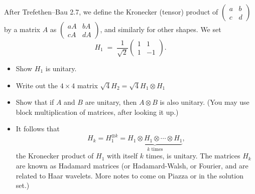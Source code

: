 \documentclass[lang=cn,11pt]{elegantbook}
\begin{document}
After Trefethen--Bau 2.7, we define the Kronecker (tensor) product of
\(\begin{pmatrix}a & b \\ c & d\end{pmatrix}\) by a matrix \(A\)
as \(\begin{pmatrix}aA & bA \\ cA & dA\end{pmatrix}\), and similarly for other shapes.
We set 
\[
  H_1 \;=\;\frac{1}{\sqrt{2}}
  \begin{pmatrix}
    1 & 1\\
    1 & -1
  \end{pmatrix}.
\]
\begin{itemize}
  \item[(a)] Show \(H_1\) is unitary.
  \item[(b)] Write out the \(4\times 4\) matrix \(\sqrt{4}H_2 = \sqrt{4} H_1 \otimes H_1\)
  \item[(c)] Show that if \(A\) and \(B\) are unitary, then \(A\otimes B\) is also unitary. (You may use block multiplication of matrices, after looking it up.)

   \item[(d)] It follows that 
\[
H_k = H_1^{\otimes k} = \underbrace{H_1 \otimes H_1 \otimes \cdots \otimes H_1}_{k \text{ times}},
\]
the Kronecker product of $H_1$ with itself $k$ times, is unitary. The matrices $H_k$ are known as Hadamard matrices (or Hadamard-Walsh, or Fourier, and are related to Haar wavelets. More notes to come on Piazza or in the solution set.)


\end{itemize}
\end{document}
